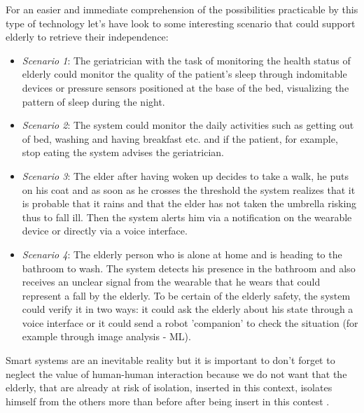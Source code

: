 \documentclass{thesisreport}
\begin{document}
 For an easier and immediate comprehension of the possibilities practicable by this type of technology let's have look to some interesting scenario that could support elderly to retrieve their independence:
 \begin{itemize}
     \item \textit{Scenario 1}: The geriatrician with the task of monitoring the health status of elderly could monitor the quality of the patient's sleep through indomitable devices or pressure sensors positioned at the base of the bed, visualizing the pattern of sleep during the night.
     \item \textit{Scenario 2}: The system could monitor the daily activities such as getting out of bed, washing and having breakfast etc. and if the patient, for example, stop eating the system advises the geriatrician.
     \item \textit{Scenario 3}: The elder after having woken up decides to take a walk, he puts on his coat and as soon as he crosses the threshold the system realizes that it is probable that it rains and that the elder has not taken the umbrella risking thus to fall ill. Then the system alerts him via a notification on the wearable device or directly via a voice interface.
     \item \textit{Scenario 4}: The elderly person who is alone at home  and is heading to the bathroom to wash. The system detects his presence in the bathroom and also receives an unclear signal from the wearable that he wears that could represent a fall by the elderly. To be certain of the elderly safety, the system could verify it  in two ways: it could ask the elderly about his state through a voice interface or it could send a robot 'companion' to check the situation (for example through image analysis - ML).
 \end{itemize}
 
 Smart systems are an inevitable reality but it is important to don't forget to neglect the value of human-human interaction because we do not want that the elderly, that are already at risk of isolation, inserted in this context, isolates himself from the others more than before after being insert in this contest \cite{phdthesis}.
 
\end{document}
